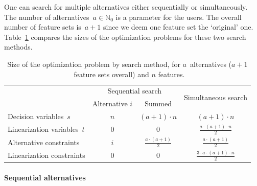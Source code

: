 \documentclass[iicol, sn-basic, Numbered]{sn-jnl} %
\theoremstyle{plain}
\theoremstyle{definition}
\begin{document}
One can search for multiple alternatives either sequentially or simultaneously.
The number of alternatives~$a \in \mathbb{N}_0$ is a parameter for the users.
The overall number of feature sets is~$a+1$ since we deem one feature set the `original' one.
Table~\ref{tab:afs:seq-sim-comparison} compares the sizes of the optimization problems for these two search methods.

\begin{table}[t]
	\centering
	\renewcommand*{\arraystretch}{1.3} %
	\begin{tabular}{lccc}
		\toprule
		& \multicolumn{2}{c}{Sequential search} & \multirow{2}{*}{Simultaneous search} \\
		\cmidrule(r){2-3}
		& Alternative $i$ & Summed & \\
		\midrule
		Decision variables~$s$ & $n$ & $ (a+1) \cdot n$ & $(a+1) \cdot n$ \\
		Linearization variables~$t$ & $0$ & $0$ & $\frac{a \cdot (a+1) \cdot n}{2}$ \\
		Alternative constraints & $i$ & $\frac{a \cdot (a+1)}{2}$ & $\frac{a \cdot (a+1)}{2}$ \\
		Linearization constraints & $0$ & $0$ & $\frac{3 \cdot a \cdot (a+1) \cdot n}{2}$ \\
		\bottomrule
	\end{tabular}
	\caption{Size of the optimization problem by search method, for $a$~alternatives ($a + 1$~feature sets overall) and $n$ features.}
	\label{tab:afs:seq-sim-comparison}
\end{table}

\paragraph{Sequential alternatives}
\end{document}
